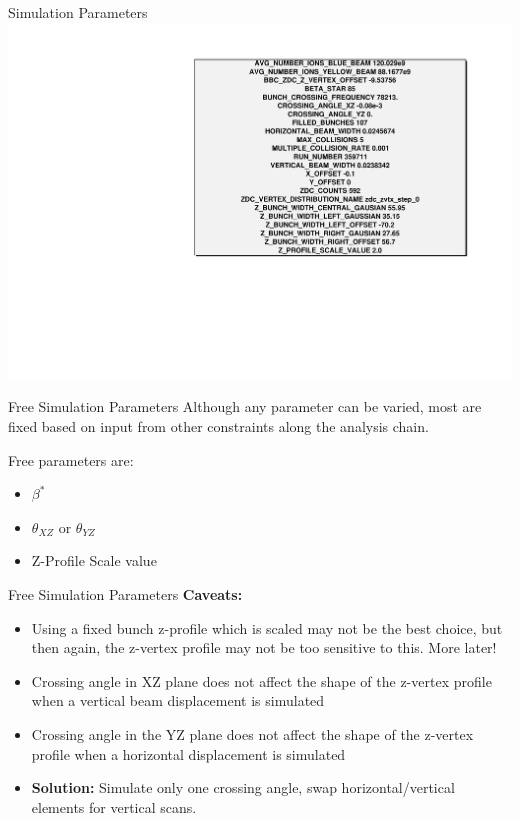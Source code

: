 \begin{frame} {Simulation Parameters}
\includegraphics[width=\linewidth,height=\textheight]{../HourglassSimulation/figs/sample_configuration.pdf}
\end{frame}

\begin{frame} {Free Simulation Parameters}
Although any parameter can be varied, most are fixed based on input from other
constraints along the analysis chain.
\newline

Free parameters are:
\begin{itemize}
\item $\beta^*$
\item $\theta_{XZ}$ or $\theta_{YZ}$  
\item Z-Profile Scale value
\newline
\end{itemize}
\end{frame}

\begin{frame}{Free Simulation Parameters}
\textbf{Caveats:}
\begin{itemize}
\item Using a fixed bunch z-profile which is scaled may not be the best choice,
	but then again, the z-vertex profile may not be too sensitive to this.
	More later!
\item Crossing angle in XZ plane does not affect the shape of the z-vertex
	profile when a vertical beam displacement is simulated
\item Crossing angle in the YZ plane does not affect the shape of the z-vertex
	profile when a horizontal displacement is simulated
\item \textbf{Solution:} Simulate only one crossing angle, swap
	horizontal/vertical elements for vertical scans.
\end{itemize}

\end{frame}
